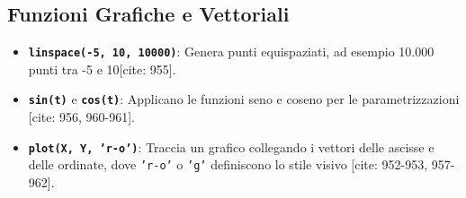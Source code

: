 \documentclass[a4paper,12pt]{article}
\begin{document}
	\subsection*{Funzioni Grafiche e Vettoriali}
	\begin{itemize}
		\item \textbf{\texttt{linspace(-5, 10, 10000)}}: Genera punti equispaziati, ad esempio 10.000 punti tra -5 e 10[cite: 955].
		\item \textbf{\texttt{sin(t)}} e \textbf{\texttt{cos(t)}}: Applicano le funzioni seno e coseno per le parametrizzazioni [cite: 956, 960-961].
		\item \textbf{\texttt{plot(X, Y, 'r-o')}}: Traccia un grafico collegando i vettori delle ascisse e delle ordinate, dove \texttt{'r-o'} o \texttt{'g'} definiscono lo stile visivo [cite: 952-953, 957-962].
	\end{itemize}
	
\end{document}
